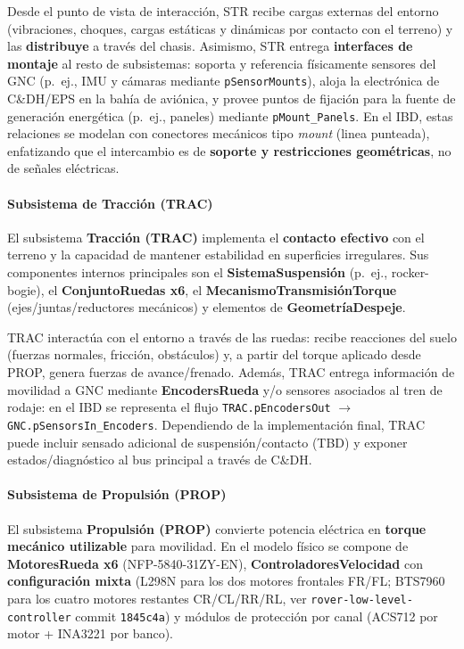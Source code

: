 Desde el punto de vista de interacción, STR recibe cargas externas del entorno (vibraciones, choques, cargas estáticas y dinámicas por contacto con el terreno) y las \textbf{distribuye} a través del chasis. Asimismo, STR entrega \textbf{interfaces de montaje} al resto de subsistemas: soporta y referencia físicamente sensores del GNC (p.\ ej., IMU y cámaras mediante \texttt{pSensorMounts}), aloja la electrónica de C\&DH/EPS en la bahía de aviónica, y provee puntos de fijación para la fuente de generación energética (p.\ ej., paneles) mediante \texttt{pMount\_Panels}. En el IBD, estas relaciones se modelan con conectores mecánicos tipo \textit{mount} (linea punteada), enfatizando que el intercambio es de \textbf{soporte y restricciones geométricas}, no de señales eléctricas.

\paragraph{Subsistema de Tracción (TRAC)}
El subsistema \textbf{Tracción (TRAC)} implementa el \textbf{contacto efectivo} con el terreno y la capacidad de mantener estabilidad en superficies irregulares. Sus componentes internos principales son el \textbf{SistemaSuspensión} (p.\ ej., rocker-bogie), el \textbf{ConjuntoRuedas x6}, el \textbf{MecanismoTransmisiónTorque} (ejes/juntas/reductores mecánicos) y elementos de \textbf{GeometríaDespeje}.

TRAC interactúa con el entorno a través de las ruedas: recibe reacciones del suelo (fuerzas normales, fricción, obstáculos) y, a partir del torque aplicado desde PROP, genera fuerzas de avance/frenado. Además, TRAC entrega información de movilidad a GNC mediante \textbf{EncodersRueda} y/o sensores asociados al tren de rodaje: en el IBD se representa el flujo \texttt{TRAC.pEncodersOut} $\rightarrow$ \texttt{GNC.pSensorsIn\_Encoders}. Dependiendo de la implementación final, TRAC puede incluir sensado adicional de suspensión/contacto (TBD) y exponer estados/diagnóstico al bus principal a través de C\&DH.

\paragraph{Subsistema de Propulsión (PROP)}
El subsistema \textbf{Propulsión (PROP)} convierte potencia eléctrica en \textbf{torque mecánico utilizable} para movilidad. En el modelo físico se compone de \textbf{MotoresRueda x6} (NFP-5840-31ZY-EN), \textbf{ControladoresVelocidad} con \textbf{configuración mixta} (L298N para los dos motores frontales FR/FL; BTS7960 para los cuatro motores restantes CR/CL/RR/RL, ver \texttt{rover-low-level-controller} commit \texttt{1845c4a}) y módulos de protección por canal (ACS712 por motor + INA3221 por banco).

